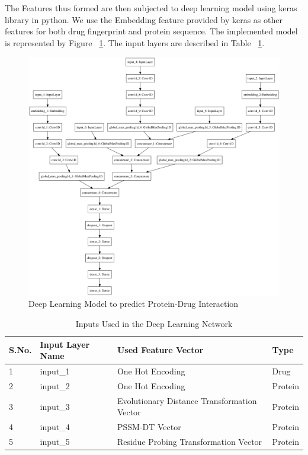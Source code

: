 The Features thus formed are then subjected to deep learning model using keras library in python. We use the Embedding feature provided by keras as other features for both drug fingerprint and protein sequence. The implemented model is represented by Figure ~\ref{fig:dlm}. The input layers are described in Table ~\ref{table:inputs}.

\begin{figure}[ht]
\centering
\includegraphics[width=1\linewidth]{mainmatter/3-Methodology/images/build_combined_categorical_tensor_contact_new.png}
\caption{Deep Learning Model to predict Protein-Drug Interaction}
\label{fig:dlm}
\end{figure}
\begin{table}[ht]\centering
  \caption{Inputs Used in the Deep Learning Network} 
  \begin{tabular}{|l|l|l|l|}
    \hline 
    S.No. & Input Layer Name & Used Feature Vector & Type \\ \hline
    1 & input\_1 & One Hot Encoding & Drug \\ \hline
    2 & input\_2 & One Hot Encoding & Protein \\ \hline
    3 & input\_3 & Evolutionary Distance Transformation Vector& Protein \\ \hline
    4 & input\_4 & PSSM-DT Vector & Protein \\ \hline
    5 & input\_5 & Residue Probing Transformation Vector & Protein \\   \hline 
  \end{tabular} 
  
  \label{table:inputs}
\end{table}

